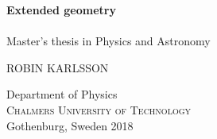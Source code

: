 
\begin{titlepage}
			
\addtolength{\voffset}{2cm}

\begin{figure}[H]
\centering
\vspace{2cm}	%
\end{figure}


\newcommand{\headtitle}{Extended geometry}
\newcommand{\subtitle}{Extensions of geometry motivated by the symmetries of string theory/M-theory}


\mbox{}
\vfill
\renewcommand{\familydefault}{\sfdefault} \normalfont %
\textbf{{\Huge 	\headtitle}} 	\\[0.5cm]
{\Large }\\[0.5cm]
Master's thesis in Physics and Astronomy \setlength{\parskip}{1cm}

{\Large ROBIN KARLSSON} \setlength{\parskip}{2.9cm}

Department of Physics \\
\textsc{Chalmers University of Technology} \\
Gothenburg, Sweden 2018

\renewcommand{\familydefault}{\rmdefault} \normalfont %
\end{titlepage}


\newpage
\restoregeometry
\thispagestyle{empty}
\mbox{}


